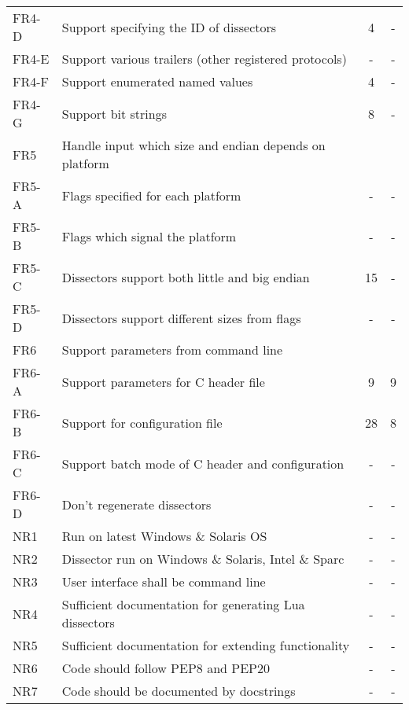 \begin{table}[ht]
\begin{tabularx}{\textwidth}{l X c c}
	FR4-D & Support specifying the ID of dissectors & 4 & - \\
	FR4-E & Support various trailers (other registered protocols) & - & - \\
	FR4-F & Support enumerated named values  & 4 & - \\
	FR4-G & Support bit strings & 8 & - \\
	\addlinespace
	FR5 & Handle input which size and endian depends on platform & & \\
	FR5-A & Flags specified for each platform & - & - \\
	FR5-B & Flags which signal the platform & - & - \\
	FR5-C & Dissectors support both little and big endian & 15 & - \\
	FR5-D & Dissectors support different sizes from flags & - & - \\	
	\addlinespace
	FR6 & Support parameters from command line & & \\
	FR6-A & Support parameters for C header file & 9 & 9 \\
	FR6-B & Support for configuration file & 28 & 8 \\
	FR6-C & Support batch mode of C header and configuration & - & - \\
	FR6-D & Don't regenerate dissectors & - & - \\
	\addlinespace
	NR1 & Run on latest Windows \& Solaris OS & - & - \\
	NR2 & Dissector run on Windows \& Solaris, Intel \& Sparc & - & - \\
	NR3 & User interface shall be command line & - & - \\
	NR4 & Sufficient documentation for generating Lua dissectors & - & - \\
	NR5 & Sufficient documentation for extending functionality & - & - \\
	NR6 & Code should follow PEP8 and PEP20 & - & - \\
	NR7 & Code should be documented by docstrings & - & - \\
	\bottomrule
\end{tabularx}
\end{table}

